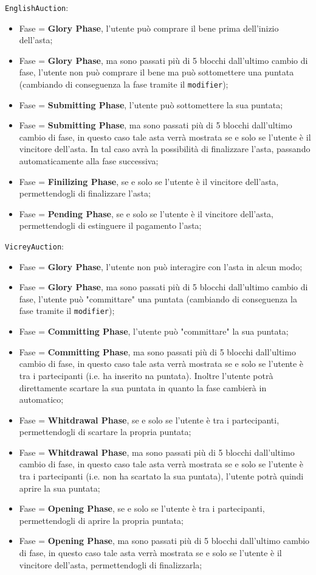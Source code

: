 \texttt{EnglishAuction}:
\begin{itemize}
	\item Fase = \textbf{Glory Phase}, l'utente può comprare il bene prima dell'inizio dell'asta;
	\item Fase = \textbf{Glory Phase}, ma sono passati più di 5 blocchi dall'ultimo cambio di fase, l'utente non può comprare il bene ma può sottomettere una puntata (cambiando di conseguenza la fase tramite il \texttt{modifier});
	\item Fase = \textbf{Submitting Phase}, l'utente può sottomettere la sua puntata;
	\item Fase = \textbf{Submitting Phase}, ma sono passati più di 5 blocchi dall'ultimo cambio di fase, in questo caso tale asta verrà mostrata se e solo se l'utente è il vincitore dell'asta. In tal caso avrà la possibilità di finalizzare l'asta, passando automaticamente alla fase successiva;
	\item Fase = \textbf{Finilizing Phase}, se e solo se l'utente è il vincitore dell'asta, permettendogli di finalizzare l'asta;
	\item Fase = \textbf{Pending Phase}, se e solo se l'utente è il vincitore dell'asta, permettendogli di estinguere il pagamento l'asta;
\end{itemize}
\texttt{VicreyAuction}:
\begin{itemize}
	\item Fase = \textbf{Glory Phase}, l'utente non può interagire con l'asta in alcun modo;
	\item Fase = \textbf{Glory Phase}, ma sono passati più di 5 blocchi dall'ultimo cambio di fase, l'utente può "committare" una puntata (cambiando di conseguenza la fase tramite il \texttt{modifier});
	\item Fase = \textbf{Committing Phase}, l'utente può "committare" la sua puntata;
	\item Fase = \textbf{Committing Phase}, ma sono passati più di 5 blocchi dall'ultimo cambio di fase, in questo caso tale asta verrà mostrata se e solo se l'utente è tra i partecipanti (i.e. ha inserito na puntata). Inoltre l'utente potrà direttamente scartare la sua puntata in quanto la fase cambierà in automatico;
	\item Fase = \textbf{Whitdrawal Phase}, se e solo se l'utente è tra i partecipanti, permettendogli di scartare la propria puntata;
	\item Fase = \textbf{Whitdrawal Phase}, ma sono passati più di 5 blocchi dall'ultimo cambio di fase, in questo caso tale asta verrà mostrata se e solo se l'utente è tra i partecipanti (i.e. non ha scartato la sua puntata), l'utente potrà quindi aprire la sua puntata;
	\item Fase = \textbf{Opening Phase}, se e solo se l'utente è tra i partecipanti, permettendogli di aprire la propria puntata;
	\item Fase = \textbf{Opening Phase}, ma sono passati più di 5 blocchi dall'ultimo cambio di fase, in questo caso tale asta verrà mostrata se e solo se l'utente è il vincitore dell'asta, permettendogli di finalizzarla;
\end{itemize}
